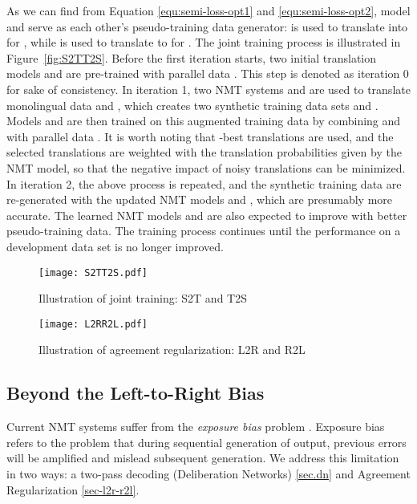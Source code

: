 \documentclass[a4paper]{article}
\begin{document}
\begin{CJK*}{UTF8}{gbsn}
As we can find from Equation \ref{equ:semi-loss-opt1} and \ref{equ:semi-loss-opt2},  model  and  serve as each other's pseudo-training data generator:  is used to translate  into  for , while  is used to translate  to  for .  
The joint training process is illustrated in Figure~\ref{fig:S2TT2S}. Before the first iteration starts, two initial translation models  and  are pre-trained with parallel data . This step is denoted as iteration 0 for sake of consistency. In iteration 1, two NMT systems  and  are used to translate monolingual data  and , which creates two synthetic training data sets  and . 
Models  and  are then trained on this augmented training data by combining  and  with parallel data .
It is worth noting that -best translations are used, and the selected translations are weighted with the translation probabilities given by the NMT model, so that the negative impact of noisy translations can be minimized. In iteration 2, the above process is repeated, and the synthetic training data are re-generated with the updated NMT models  and , which are presumably more accurate. The learned NMT models  and  are also expected to improve with better pseudo-training data. The training process continues until the performance on a development data set is no longer improved. 

\begin{figure}
    \centering
    \begin{minipage}[t]{0.48\textwidth}\centering \texttt{[image: S2TT2S.pdf]}
  		\caption{Illustration of joint training: S2T  and T2S }
  \label{fig:S2TT2S}
    \end{minipage}\hfill
    \begin{minipage}[t]{0.48\textwidth}\centering \texttt{[image: L2RR2L.pdf]}
		\caption{Illustration of agreement regularization: L2R  and R2L }
		\label{fig:L2RR2L}
	\end{minipage}
\end{figure}
 \subsection{Beyond the Left-to-Right Bias}
\label{sec.delb}

Current NMT systems suffer from the {\em exposure bias} problem \cite{bengio2015scheduled}. Exposure bias refers to the problem that during sequential generation of output, previous errors will be amplified and mislead subsequent generation. We address this limitation in two ways: a two-pass decoding (Deliberation Networks) \ref{sec.dn} and Agreement Regularization \ref{sec-l2r-r2l}.


\end{CJK*}
\end{document}
